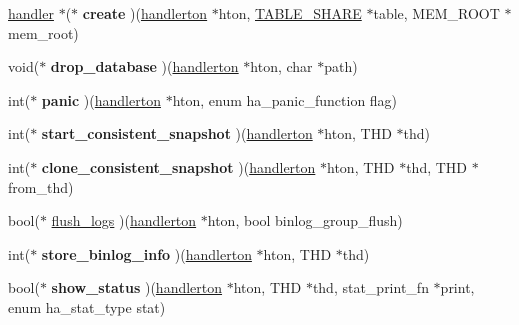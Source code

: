 \begin{DoxyCompactItemize}
\mbox{\hyperlink{classhandler}{handler}} $\ast$($\ast$ {\bfseries create} )(\mbox{\hyperlink{structhandlerton}{handlerton}} $\ast$hton, \mbox{\hyperlink{structTABLE__SHARE}{T\+A\+B\+L\+E\+\_\+\+S\+H\+A\+RE}} $\ast$table, M\+E\+M\+\_\+\+R\+O\+OT $\ast$mem\+\_\+root)
\item 
\mbox{\label{structhandlerton_aa1eb62f336f4236512338d3caa444483}} 
void($\ast$ {\bfseries drop\+\_\+database} )(\mbox{\hyperlink{structhandlerton}{handlerton}} $\ast$hton, char $\ast$path)
\item 
\mbox{\label{structhandlerton_a80b43bb854d71d7dc763e4476e7b3d4c}} 
int($\ast$ {\bfseries panic} )(\mbox{\hyperlink{structhandlerton}{handlerton}} $\ast$hton, enum ha\+\_\+panic\+\_\+function flag)
\item 
\mbox{\label{structhandlerton_a1cac38a7793101cb153dc1a7a641787d}} 
int($\ast$ {\bfseries start\+\_\+consistent\+\_\+snapshot} )(\mbox{\hyperlink{structhandlerton}{handlerton}} $\ast$hton, T\+HD $\ast$thd)
\item 
\mbox{\label{structhandlerton_a904494eefd1f3d9ce520e7d248eeab7d}} 
int($\ast$ {\bfseries clone\+\_\+consistent\+\_\+snapshot} )(\mbox{\hyperlink{structhandlerton}{handlerton}} $\ast$hton, T\+HD $\ast$thd, T\+HD $\ast$from\+\_\+thd)
\item 
bool($\ast$ \mbox{\hyperlink{structhandlerton_acaa0802b5a0dcd67a52ac65678d0ed9d}{flush\+\_\+logs}} )(\mbox{\hyperlink{structhandlerton}{handlerton}} $\ast$hton, bool binlog\+\_\+group\+\_\+flush)
\item 
\mbox{\label{structhandlerton_aa9014fc60ffcd62a0566487ca387b4cd}} 
int($\ast$ {\bfseries store\+\_\+binlog\+\_\+info} )(\mbox{\hyperlink{structhandlerton}{handlerton}} $\ast$hton, T\+HD $\ast$thd)
\item 
\mbox{\label{structhandlerton_a0dfbc51ae3b674c7a9e9daa6b3d48351}} 
bool($\ast$ {\bfseries show\+\_\+status} )(\mbox{\hyperlink{structhandlerton}{handlerton}} $\ast$hton, T\+HD $\ast$thd, stat\+\_\+print\+\_\+fn $\ast$print, enum ha\+\_\+stat\+\_\+type stat)
\item 
\mbox{\label{structhandlerton_a9e6a59ed9d5b2babdb6eb23b05f7c852}} 

\end{DoxyCompactItemize}
